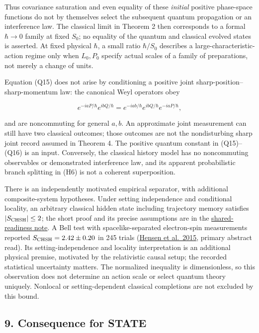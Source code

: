 \documentclass[11pt,a4paper]{article}
\begin{document}
Thus covariance saturation and even equality of these \emph{initial}
positive phase-space functions do not by themselves select the
subsequent quantum propagation or an interference law. The classical
limit in Theorem 2 then corresponds to a formal \(\hbar\to0\) family at
fixed \(S_0\); no equality of the quantum and classical evolved states
is asserted. At fixed physical \(\hbar\), a small ratio \(\hbar/S_0\)
describes a large-characteristic-action regime only when \(L_0,P_0\)
specify actual scales of a family of preparations, not merely a change
of units.

Equation (Q15) does not arise by conditioning a positive joint
sharp-position--sharp-momentum law: the canonical Weyl operators obey

\[
 e^{-iaP/\hbar}e^{ibQ/\hbar}
   =e^{-iab/\hbar}e^{ibQ/\hbar}e^{-iaP/\hbar}, \tag{Q16}
\]

and are noncommuting for general \(a,b\). An approximate joint
measurement can still have two classical outcomes; those outcomes are
not the nondisturbing sharp joint record assumed in Theorem 4. The
positive quantum constant in (Q15)--(Q16) is an input. Conversely, the
classical history model has no noncommuting observables or demonstrated
interference law, and its apparent probabilistic branch splitting in
(H6) is not a coherent superposition.

There is an independently motivated empirical separator, with additional
composite-system hypotheses. Under setting independence and conditional
locality, an arbitrary classical hidden state including trajectory
memory satisfies \(|S_{\rm CHSH}|\le2\); the short proof and its precise
assumptions are in the \href{shared-readiness-chsh.md}{shared-readiness
note}. A Bell test with spacelike-separated electron-spin measurements
reported \(S_{\rm CHSH}=2.42\pm0.20\) in 245 trials
(\href{https://doi.org/10.1038/nature15759}{Hensen et al.~2015}, primary
abstract read). Its setting-independence and locality interpretation is
an additional physical premise, motivated by the relativistic causal
setup; the recorded statistical uncertainty matters. The normalized
inequality is dimensionless, so this observation does not determine an
action scale or select quantum theory uniquely. Nonlocal or
setting-dependent classical completions are not excluded by this bound.

\hypertarget{consequence-for-state}{%
\subsection{9. Consequence for STATE}\label{consequence-for-state}}
\end{document}
